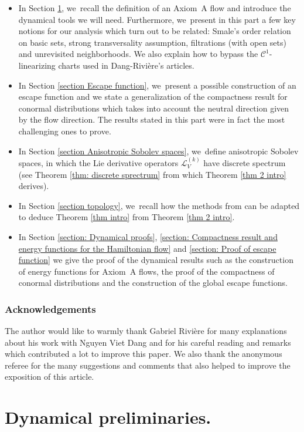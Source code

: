 \documentclass[11pt]{article}
\theoremstyle{definition}
\theoremstyle{plain}
\newcommand{\Ccal}{\mathcal{C}}
\newcommand{\Lie}{\mathcal{L}}
\begin{document}
\begin{itemize}
\item In Section \ref{section Dynamical preliminaries}, we~recall the definition of an Axiom~A flow and introduce the dynamical tools we will need. Furthermore, we~present in this part a few key notions for our analysis which turn out to be related: Smale's order relation on basic sets, strong transversality assumption, filtrations (with open sets) and unrevisited neighborhoods. We also explain how to bypass the $\Ccal^1$-linearizing charts used in Dang-Rivière's articles.
\item In Section \ref{section Escape function}, we~present a possible construction of an escape function and we state a generalization of the compactness result for conormal distributions which takes into account the neutral direction given by the flow direction. The results stated in this part were in fact the most challenging ones to prove.
\item In Section \ref{section Anisotropic Sobolev spaces}, we~define anisotropic Sobolev spaces, in which the Lie derivative operators $\Lie_V^{(k)}$ have discrete spectrum (see Theorem \ref{thm: discrete sprectrum} from which Theorem \ref{thm 2 intro} derives).
\item In Section \ref{section topology}, we~recall how the methods from \cite{DR0, DRIII} can be adapted to deduce Theorem \ref{thm intro} from Theorem \ref{thm 2 intro}.
\item In Section \ref{section: Dynamical proofs}, \ref{section: Compactness result and energy functions for the Hamiltonian flow} and \ref{section: Proof of escape function} we give the proof of the dynamical results such as the construction of energy functions for Axiom~A flows, the proof of the compactness of conormal distributions and the construction of the global escape functions.
\end{itemize}

\subsubsection*{Acknowledgements} The author would like to warmly thank Gabriel Rivière for many explanations about his work with Nguyen Viet Dang and for his careful reading and remarks which contributed a lot to improve this paper. We also thank the anonymous referee for the many suggestions and comments that also helped to improve the exposition of this article.

\section{Dynamical preliminaries.}\label{section Dynamical preliminaries}
\end{document}
